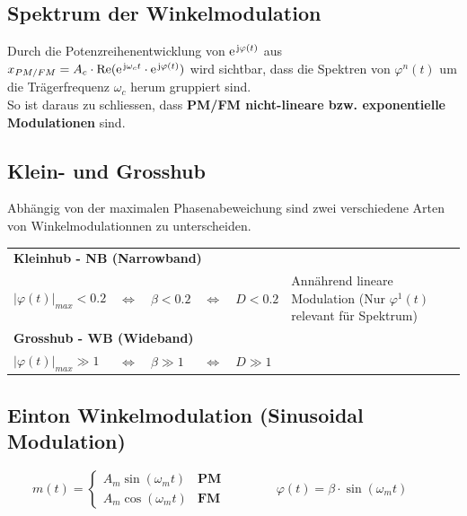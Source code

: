 \subsection{Spektrum der Winkelmodulation}
Durch die Potenzreihenentwicklung von $\e^{\im\varphi(t)}$ aus $x_{PM/FM} = A_c \cdot \Real(\e^{\im \omega_c t} \cdot \e^{\im\varphi(t)})$ wird sichtbar, dass die Spektren von $\varphi^n(t)$ um die Trägerfrequenz $\omega_c$ herum gruppiert sind.\\
So ist daraus zu schliessen, dass \textbf{PM/FM nicht-lineare bzw. exponentielle Modulationen} sind.

\subsection{Klein- und Grosshub }
Abhängig von der maximalen Phasenabeweichung sind zwei verschiedene Arten von Winkelmodulationnen zu
unterscheiden.

\begin{tabular}{llll}
\multicolumn{3}{l}{\textbf{Kleinhub - NB (Narrowband)}} \\
	$|\varphi(t)|_{max} < 0.2$ 
	& $\Leftrightarrow \quad \beta < 0.2$
	& $\Leftrightarrow \quad D < 0.2$ 
	& Ann\"ahrend lineare Modulation (Nur $\varphi^1(t)$ relevant für Spektrum)\\

\multicolumn{3}{l}{\textbf{Grosshub - WB (Wideband)}}\\
 $|\varphi(t)|_{max} \gg 1$
 & $\Leftrightarrow \quad \beta \gg 1$
 & $\Leftrightarrow \quad D \gg 1$

\end{tabular}
 

\subsection{Einton Winkelmodulation (Sinusoidal Modulation) }
	\begin{minipage}[t][0.7cm][c]{10cm}
		$ \qquad m(t) = \begin{cases}
          	A_m \sin(\omega_m t)  & \textbf{PM}\\
          	A_m \cos(\omega_m t)  & \textbf{FM}
          \end{cases}  
		\qquad \qquad \varphi(t) = \beta \cdot \sin(\omega_m t)$
\end{minipage}


